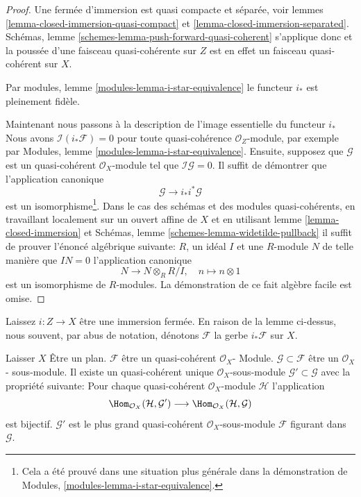 \begin{proof}
Une fermée d'immersion est quasi compacte et séparée, voir lemmes \ref{lemma-closed-immersion-quasi-compact} et \ref{lemma-closed-immersion-separated}. Schémas, lemme \ref{schemes-lemma-push-forward-quasi-coherent} s'applique donc et la poussée d'une faisceau quasi-cohérente sur $Z$ est en effet un faisceau quasi-cohérent sur $X$.

\medskip\noindent

Par modules, lemme \ref{modules-lemma-i-star-equivalence}
le functeur $i_*$ est pleinement fidèle.

\medskip\noindent

Maintenant nous passons à la description de l'image essentielle du functeur $i_*$Nous avons $\mathcal{I}(i_*\mathcal{F}) = 0$
pour toute quasi-cohérence $\mathcal{O}_Z$-module, par exemple par Modules, lemme \ref{modules-lemma-i-star-equivalence}. Ensuite, supposez que $\mathcal{G}$
est un quasi-cohérent $\mathcal{O}_X$-module tel que
$\mathcal{I}\mathcal{G} = 0$. Il suffit de démontrer que l'application canonique
$$
\mathcal{G} \longrightarrow i_* i^*\mathcal{G}
$$
est un isomorphisme\footnote{Cela a été prouvé dans une situation plus générale dans la démonstration de Modules, \ref{modules-lemma-i-star-equivalence}.}. Dans le cas des schémas et des modules quasi-cohérents, en travaillant localement sur un ouvert affine de $X$ et en utilisant lemme \ref{lemma-closed-immersion} et Schémas, lemme \ref{schemes-lemma-widetilde-pullback}
il suffit de prouver l'énoncé algébrique suivante:
$R$, un idéal $I$ et une $R$-module $N$ de telle manière que $IN = 0$ l'application canonique
$$
N \longrightarrow N \otimes_R R/I,\quad
n \longmapsto n \otimes 1
$$
est un isomorphisme de $R$-modules. La démonstration de ce fait algèbre facile est omise.

\end{proof}

\noindent
Laissez $i : Z \to X$ être une immersion fermée. En raison de la lemme ci-dessus, nous souvent, par abus de notation, dénotons $\mathcal{F}$ la gerbe $i_*\mathcal{F}$ sur $X$.

\begin{lemma}

\label{lemma-largest-quasi-coherent-subsheaf}

Laisser $X$ Être un plan. $\mathcal{F}$ être un quasi-cohérent
$\mathcal{O}_X$- Module. $\mathcal{G} \subset \mathcal{F}$
être un $\mathcal{O}_X$- sous-module. Il existe un quasi-cohérent unique
$\mathcal{O}_X$-sous-module $\mathcal{G}' \subset \mathcal{G}$
avec la propriété suivante: Pour chaque quasi-cohérent $\mathcal{O}_X$-module
$\mathcal{H}$ l'application
$$
\Hom_{\mathcal{O}_X}(\mathcal{H}, \mathcal{G}')
\longrightarrow
\Hom_{\mathcal{O}_X}(\mathcal{H}, \mathcal{G})
$$
est bijectif. $\mathcal{G}'$ est le plus grand quasi-cohérent
$\mathcal{O}_X$-sous-module $\mathcal{F}$ figurant dans $\mathcal{G}$.

\end{lemma}

